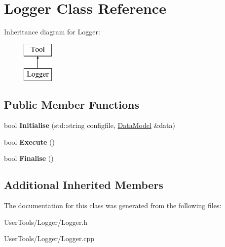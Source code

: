 \hypertarget{classLogger}{\section{Logger Class Reference}
\label{classLogger}
}
Inheritance diagram for Logger\-:\begin{figure}[H]
\begin{center}
\leavevmode
\includegraphics[height=2.000000cm]{classLogger}
\end{center}
\end{figure}
\subsection*{Public Member Functions}
\begin{DoxyCompactItemize}
\item 
\hypertarget{classLogger_a1b598f35f454e24f9e9abc9f18c3e98f}{bool {\bfseries Initialise} (std\-::string configfile, \hyperlink{classDataModel}{Data\-Model} \&data)}\label{classLogger_a1b598f35f454e24f9e9abc9f18c3e98f}

\item 
\hypertarget{classLogger_a140ebede2975159a5abe7c59e56ec0ec}{bool {\bfseries Execute} ()}\label{classLogger_a140ebede2975159a5abe7c59e56ec0ec}

\item 
\hypertarget{classLogger_a2c70367a86d5999db21324ccb58f44ed}{bool {\bfseries Finalise} ()}\label{classLogger_a2c70367a86d5999db21324ccb58f44ed}

\end{DoxyCompactItemize}
\subsection*{Additional Inherited Members}


The documentation for this class was generated from the following files\-:\begin{DoxyCompactItemize}
\item 
User\-Tools/\-Logger/Logger.\-h\item 
User\-Tools/\-Logger/Logger.\-cpp\end{DoxyCompactItemize}
